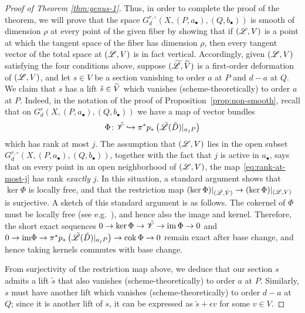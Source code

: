 \documentclass{amsart}
\begin{document}
\begin{proof}[Proof of Theorem \ref{thm:genus-1}]
Thus, in order to complete the proof of the
theorem, we will prove that the space
$G^{r,\circ}_d(X,(P,a_{\bullet}),(Q,b_{\bullet}))$ is smooth of dimension
$\rho$ at every point of the given fiber by showing that
if $({\mathscr L},V)$ is a point at which the tangent space of the fiber has
dimension $\rho$, then every tangent vector of the total space at $({\mathscr L},V)$
is in fact vertical.
Accordingly, given $({\mathscr L},V)$ satisfying the four conditions above, suppose $(\widetilde{{\mathscr L}},\widetilde{V})$ is a first-order deformation of
$({\mathscr L},V)$, and let $s \in V$ be a section vanishing to order $a$ at $P$ and
$d-a$ at $Q$.  We claim that $s$ has a lift $\tilde{s} \in \widetilde{V}$ which vanishes 
(scheme-theoretically) to order $a$ at $P$.  
Indeed, in the notation of the proof of Proposition~\ref{prop:non-smooth}, recall that on $G^{r}_d(X,(P,a_{\bullet}),(Q,b_{\bullet}))$ we have a map of vector bundles 
\begin{equation}\label{eq:rank-at-most-j}
\Phi\colon\tilde{{\mathscr V}}\hookrightarrow\pi^*p_*\left(\tilde{{\mathscr L}}(\tilde{D})|_{a_jP}\right)
\end{equation}
which has rank at most $j$.  The assumption that $({\mathscr L},V)$ lies 
in the open subset $G^{r,\circ}_d(X,(P,a_{\bullet}),(Q,b_{\bullet}))$, 
together with the 
fact that $j$ is active in $a_{\bullet}$, says that on every point in an open neighborhood of $({\mathscr L},V)$, the map~\eqref{eq:rank-at-most-j} has rank {\em exactly} $j$. In this situation, a standard argument shows that $\operatorname{ker}\Phi$ is locally free, and that the restriction map $(\operatorname{ker}\Phi)|_{(\tilde{{\mathscr L}},\tilde{V})} \rightarrow (\operatorname{ker}\Phi)|_{({\mathscr L},V)}$ is surjective. A sketch of this standard argument is as follows. The cokernel of $\Phi$ must be locally free (see e.g.~\cite[\S16.7]{ei1}), and hence also the image and kernel. Therefore, the short exact sequences $0\to\operatorname{ker}\Phi\to \tilde{{\mathscr V}} \to \operatorname{im}\Phi\to0$ and $0\to\mathrm{im}\Phi\to\pi^*p_*\left(\tilde{{\mathscr L}}(\tilde{D})|_{a_jP}\right) \to\operatorname{cok}\Phi\to 0$ remain exact after base change, and hence taking kernels commutes with base change. 

From surjectivity of the restriction map above, we deduce that our section $s$ admits a lift $\tilde{s}$ that also vanishes (scheme-theoretically) to order $a$ at $P$.
Similarly, $s$ must have
another lift which vanishes 
(scheme-theoretically) to order $d-a$ at $Q$; since it is another lift of $s$, it can be 
expressed as $\tilde{s}+\epsilon v$ for some $v \in V$.


\end{proof}
\end{document}
